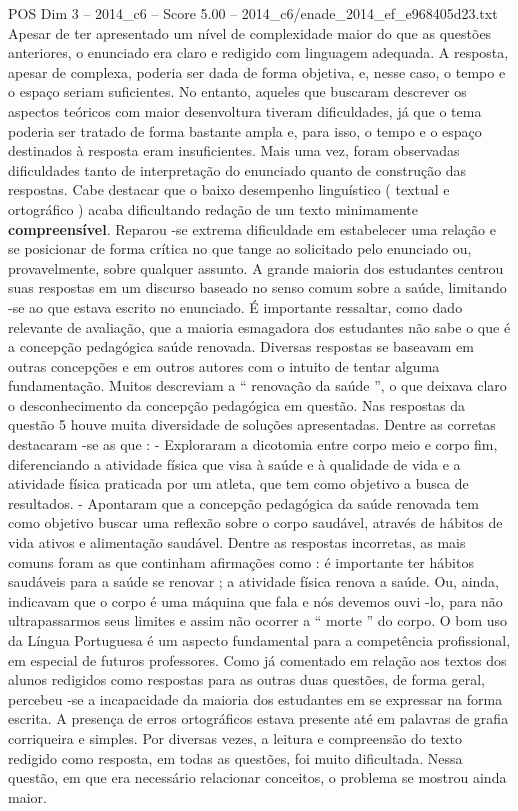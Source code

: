 \begin{textsample}{POS Dim 3 – 2014\_c6 – Score 5.00 – 2014\_c6/enade\_2014\_ef\_e968405d23.txt}
Apesar de ter apresentado um nível de complexidade maior do que as questões anteriores, o enunciado era claro e redigido com linguagem adequada.
A resposta, apesar de complexa, poderia ser dada de forma objetiva, e, nesse caso, o tempo e o espaço seriam suficientes.
No entanto, aqueles que buscaram descrever os aspectos teóricos com maior desenvoltura tiveram dificuldades, já que o tema poderia ser tratado de forma bastante ampla e, para isso, o tempo e o espaço destinados à resposta eram insuficientes.
Mais uma vez, foram observadas dificuldades tanto de interpretação do enunciado quanto de construção das respostas.
Cabe destacar que o baixo desempenho linguístico ( textual e ortográfico ) acaba dificultando redação de um texto minimamente \textbf{compreensível}.
Reparou -se extrema dificuldade em estabelecer uma relação e se posicionar de forma crítica no que tange ao solicitado pelo enunciado ou, provavelmente, sobre qualquer assunto.
A grande maioria dos estudantes centrou suas respostas em um discurso baseado no senso comum sobre a saúde, limitando -se ao que estava escrito no enunciado.
É importante ressaltar, como dado relevante de avaliação, que a maioria esmagadora dos estudantes não sabe o que é a concepção pedagógica saúde renovada.
Diversas respostas se baseavam em outras concepções e em outros autores com o intuito de tentar alguma fundamentação.
Muitos descreviam a “ renovação da saúde ”, o que deixava claro o desconhecimento da concepção pedagógica em questão.
Nas respostas da questão 5 houve muita diversidade de soluções apresentadas.
Dentre as corretas destacaram -se as que : - Exploraram a dicotomia entre corpo meio e corpo fim, diferenciando a atividade física que visa à saúde e à qualidade de vida e a atividade física praticada por um atleta, que tem como objetivo a busca de resultados. - Apontaram que a concepção pedagógica da saúde renovada tem como objetivo buscar uma reflexão sobre o corpo saudável, através de hábitos de vida ativos e alimentação saudável.
Dentre as respostas incorretas, as mais comuns foram as que continham afirmações como : é importante ter hábitos saudáveis para a saúde se renovar ; a atividade física renova a saúde.
Ou, ainda, indicavam que o corpo é uma máquina que fala e nós devemos ouvi -lo, para não ultrapassarmos seus limites e assim não ocorrer a “ morte ” do corpo.
O bom uso da Língua Portuguesa é um aspecto fundamental para a competência profissional, em especial de futuros professores.
Como já comentado em relação aos textos dos alunos redigidos como respostas para as outras duas questões, de forma geral, percebeu -se a incapacidade da maioria dos estudantes em se expressar na forma escrita.
A presença de erros ortográficos estava presente até em palavras de grafia corriqueira e simples.
Por diversas vezes, a leitura e compreensão do texto redigido como resposta, em todas as questões, foi muito dificultada.
Nessa questão, em que era necessário relacionar conceitos, o problema se mostrou ainda maior.

\end{textsample}
